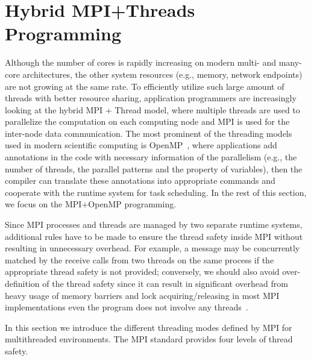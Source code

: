 \section{Hybrid MPI+Threads Programming}\label{sec:back-hybrid}

Although the number of cores is rapidly increasing on modern multi-
and many-core architectures, the other system resources (e.g., memory,
network endpoints) are not growing at the same rate. To efficiently utilize such
large amount of threads with better resource sharing, application programmers
are increasingly looking at the hybrid MPI + Thread model, where multiple threads
are used to parallelize the computation on each computing node and MPI
is used for the inter-node data communication. The most prominent of the
threading models used in modern scientific computing is OpenMP~\cite{openmp},
where applications add annotations in the code with necessary information of
the parallelism (e.g., the number of threads, the parallel patterns and
the property of variables), then the compiler can translate these annotations
into appropriate commands and cooperate with the runtime system for task
scheduling. In the rest of this section, we focus on the MPI+OpenMP programming.

Since MPI processes and threads are managed by two separate runtime systems,
additional rules have to be made to ensure the thread safety inside MPI without
resulting in unnecessary overhead. For example, a message may be concurrently
matched by the receive calls from two threads on the same process if the
appropriate thread safety is not provided; conversely, we should also avoid
over-definition of the thread safety since it can result in significant
overhead from heavy usage of memory barriers and lock acquiring\slash releasing
in most MPI implementations even the program does not involve any threads~\cite{thread-safety}.

In this section we introduce the different threading modes defined by MPI for
multithreaded environments. The MPI standard provides four levels of thread
safety.

